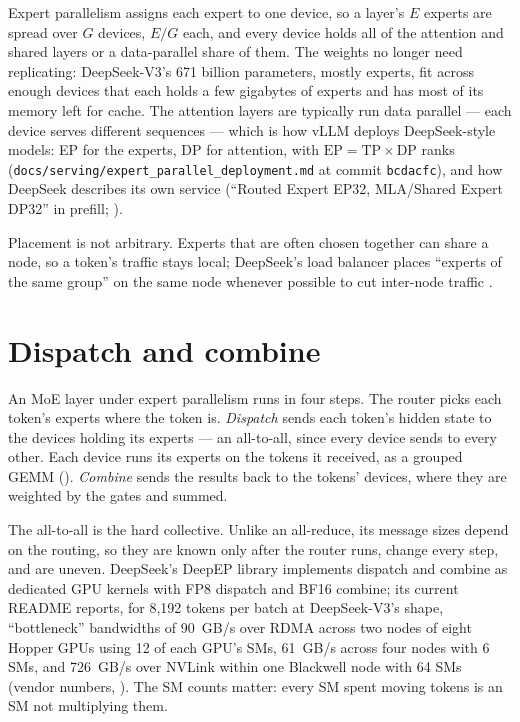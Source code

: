 Expert parallelism assigns each expert to one device, so a layer's $E$ experts
are spread over $G$ devices, $E/G$ each, and every device holds all of the
attention and shared layers or a data-parallel share of them. The weights no
longer need replicating: DeepSeek-V3's 671 billion parameters, mostly experts,
fit across enough devices that each holds a few gigabytes of experts and has
most of its memory left for cache. The attention layers are typically run data
parallel --- each device serves different sequences --- which is how vLLM
deploys DeepSeek-style models: EP for the experts, DP for attention, with
$\text{EP} = \text{TP} \times \text{DP}$ ranks (\texttt{docs/serving/expert\_parallel\_deployment.md}
at commit \texttt{bcdacfc}), and how DeepSeek describes its own service
(``Routed Expert EP32, MLA/Shared Expert DP32'' in prefill;
).

Placement is not arbitrary. Experts that are often chosen together can share a
node, so a token's traffic stays local; DeepSeek's load balancer places
``experts of the same group'' on the same node whenever possible to cut
inter-node traffic \cite{deepseek2025eplb}.

\section{Dispatch and combine}

An MoE layer under expert parallelism runs in four steps. The router picks each
token's experts where the token is. \emph{Dispatch} sends each token's hidden
state to the devices holding its experts --- an all-to-all, since every device
sends to every other. Each device runs its experts on the tokens it received,
as a grouped GEMM (). \emph{Combine} sends the results
back to the tokens' devices, where they are weighted by the gates and summed.

The all-to-all is the hard collective. Unlike an all-reduce, its message sizes
depend on the routing, so they are known only after the router runs, change
every step, and are uneven. DeepSeek's DeepEP library implements dispatch and
combine as dedicated GPU kernels with FP8 dispatch and BF16 combine; its
current README reports, for 8,192 tokens per batch at DeepSeek-V3's shape,
``bottleneck'' bandwidths of 90~GB/s over RDMA across two nodes of eight
Hopper GPUs using 12 of each GPU's SMs, 61~GB/s across four nodes with 6 SMs,
and 726~GB/s over NVLink within one Blackwell node with 64 SMs (vendor numbers,
\cite{deepseek2025deepep}). The SM counts matter: every SM spent moving tokens
is an SM not multiplying them.


